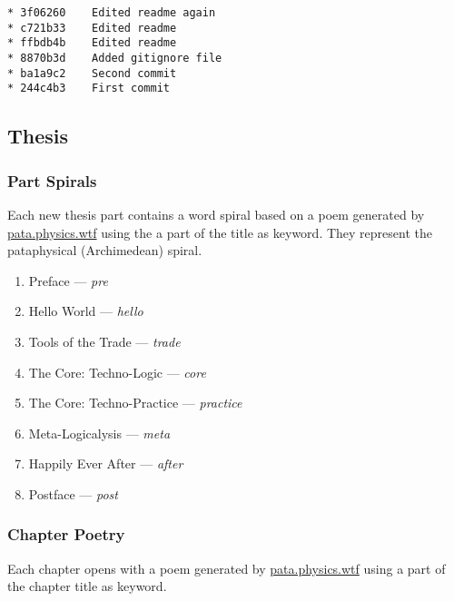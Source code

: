 {\begin{verbatim}
* 3f06260	 Edited readme again
* c721b33	 Edited readme
* ffbdb4b	 Edited readme
* 8870b3d	 Added gitignore file
* ba1a9c2	 Second commit
* 244c4b3	 First commit
\end{verbatim}


\subsection{Thesis}

\subsubsection{Part Spirals}

Each new thesis part contains a word spiral based on a poem generated by \url{pata.physics.wtf} using the a part of the title as keyword. They represent the pataphysical (Archimedean) spiral.

\begin{enumerate}
  \item Preface --- \emph{pre}
  \item Hello World --- \emph{hello}
  \item Tools of the Trade --- \emph{trade}
  \item The Core: Techno-Logic --- \emph{core}
  \item The Core: Techno-Practice --- \emph{practice}
  \item Meta-Logicalysis --- \emph{meta}
  \item Happily Ever After --- \emph{after}
  \item Postface --- \emph{post}
\end{enumerate}

\subsubsection{Chapter Poetry}

Each chapter opens with a poem generated by \url{pata.physics.wtf} using a part of the chapter title as keyword.

}
